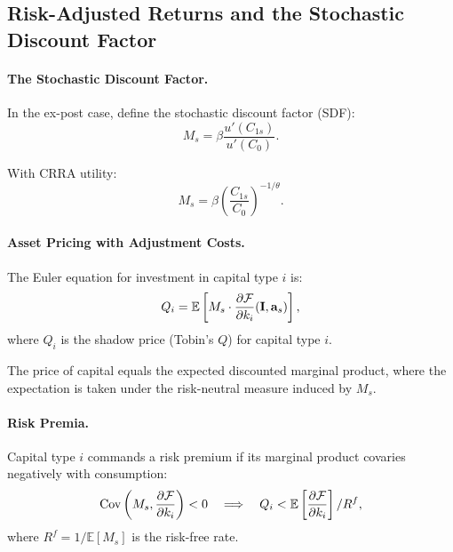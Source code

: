 \subsection{Risk-Adjusted Returns and the Stochastic Discount Factor}
\label{subsec:ac-risk-sdf}

\paragraph{The Stochastic Discount Factor.}
In the ex-post case, define the stochastic discount factor (SDF):
\begin{equation}
M_s = \beta \frac{u'(C_{1s})}{u'(C_0)}.
\label{eq:ac-risk-sdf}
\end{equation}

With CRRA utility:
\begin{equation}
M_s = \beta \left( \frac{C_{1s}}{C_0} \right)^{-1/\theta}.
\label{eq:ac-risk-sdf-crra}
\end{equation}

\paragraph{Asset Pricing with Adjustment Costs.}
The Euler equation for investment in capital type $i$ is:
\begin{equation}
Q_i = \mathbb{E}\left[ M_s \cdot \frac{\partial \mathcal{F}}{\partial k_i}(\mathbf{I}, \mathbf{a}_s) \right],
\label{eq:ac-risk-asset-price}
\end{equation}
where $Q_i$ is the shadow price (Tobin's $Q$) for capital type $i$.

The price of capital equals the expected discounted marginal product, where the expectation is taken under the risk-neutral measure induced by $M_s$.

\paragraph{Risk Premia.}
Capital type $i$ commands a risk premium if its marginal product covaries negatively with consumption:
\begin{equation}
\text{Cov}\left( M_s, \frac{\partial \mathcal{F}}{\partial k_i} \right) < 0 \quad \Longrightarrow \quad Q_i < \mathbb{E}\left[ \frac{\partial \mathcal{F}}{\partial k_i} \right] / R^f,
\label{eq:ac-risk-premium}
\end{equation}
where $R^f = 1 / \mathbb{E}[M_s]$ is the risk-free rate.

